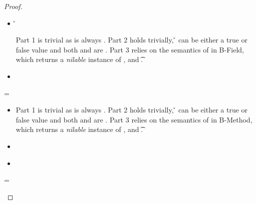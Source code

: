 \begin{lemma}
\begin{enumerate}
\begin{proof}
\begin{case}[T-FieldStatic]
\begin{itemize}
  \item[]
\begin{subcase}[B-Field]
  \opsem {\openv{}}
         {} 
         { {\classfieldpair{\fld{}} {\v{}}}}


Part 1 is trivial as \object{} is always \emptyobject{}.
Part 2 holds trivially, \v{} can be either a true or false value
and both {\thenprop{\prop{}}} and {\elseprop{\prop{}}}
are \topprop{}.
Part 3 relies on the semantics of \getfieldliteral 
in B-Field, which returns a \emph{nilable} instance of ,
and  {\t{}}.
\end{subcase}
  \item[]
\begin{subcase}[BE-Field]
\end{subcase}
\end{itemize}
\end{case}

\begin{case}[T-MethodStatic]
  \e{} = { 
                          {} 
                          {}
                          {\mth{}} {\e{}} {}}

\begin{itemize}
  \item[]
\begin{subcase}[B-Method]

Part 1 is trivial as \object{} is always \emptyobject{}.
Part 2 holds trivially, \v{} can be either a true or false value
and both {\thenprop{\prop{}}} and {\elseprop{\prop{}}}
are \topprop{}.
Part 3 relies on the semantics of \invokejavamethodliteral 
in B-Method, which returns a \emph{nilable} instance of ,
and  {\t{}}.
\end{subcase}
  \item[]
\begin{subcase}[BE-Method1]
\end{subcase}
  \item[]
\begin{subcase}[BE-Method2]
\end{subcase}
\end{itemize}

\end{case}

\begin{case}[T-DefMulti]
  \e{} = {\createmultiexp {\s{}} {}}



\end{case}
\end{proof}
\end{enumerate}
\end{lemma}
